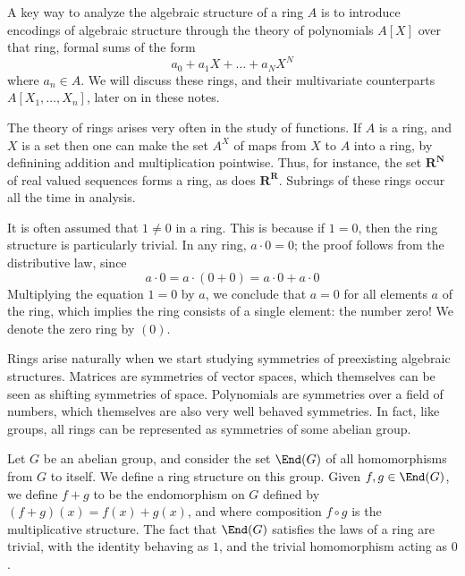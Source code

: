 \begin{example}
    A key way to analyze the algebraic structure of a ring $A$ is to introduce encodings of algebraic structure through the theory of polynomials $A[X]$ over that ring, formal sums of the form
    \[ a_0 + a_1X + \dots + a_NX^N \]
    where $a_n \in A$. We will discuss these rings, and their multivariate counterparts $A[X_1, \dots, X_n]$, later on in these notes.
\end{example}

\begin{example}
    The theory of rings arises very often in the study of functions. If $A$ is a ring, and $X$ is a set then one can make the set $A^X$ of maps from $X$ to $A$ into a ring, by definining addition and multiplication pointwise. Thus, for instance, the set $\mathbf{R}^{\mathbf{N}}$ of real valued sequences forms a ring, as does $\mathbf{R}^{\mathbf{R}}$. Subrings of these rings occur all the time in analysis.
\end{example}

It is often assumed that $1 \neq 0$ in a ring. This is because if $1 = 0$, then the ring structure is particularly trivial. In any ring, $a \cdot 0 = 0$; the proof follows from the distributive law, since
%
\[ a \cdot 0 = a \cdot (0 + 0) = a \cdot 0 + a \cdot 0 \]
%
Multiplying the equation $1 = 0$ by $a$, we conclude that $a = 0$ for all elements $a$ of the ring, which implies the ring consists of a single element: the number zero! We denote the zero ring by $(0)$.

Rings arise naturally when we start studying symmetries of preexisting algebraic structures. Matrices are symmetries of vector spaces, which themselves can be seen as shifting symmetries of space. Polynomials are symmetries over a field of numbers, which themselves are also very well behaved symmetries. In fact, like groups, all rings can be represented as symmetries of some abelian group.

\begin{example}
    Let $G$ be an abelian group, and consider the set $\End(G)$ of all homomorphisms from $G$ to itself. We define a ring structure on this group. Given $f,g \in \End(G)$, we define $f+g$ to be the endomorphism on $G$ defined by $(f + g)(x) = f(x) + g(x)$, and where composition $f \circ g$ is the multiplicative structure. The fact that $\End(G)$ satisfies the laws of a ring are trivial, with the identity behaving as $1$, and the trivial homomorphism acting as $0$.
\end{example}

